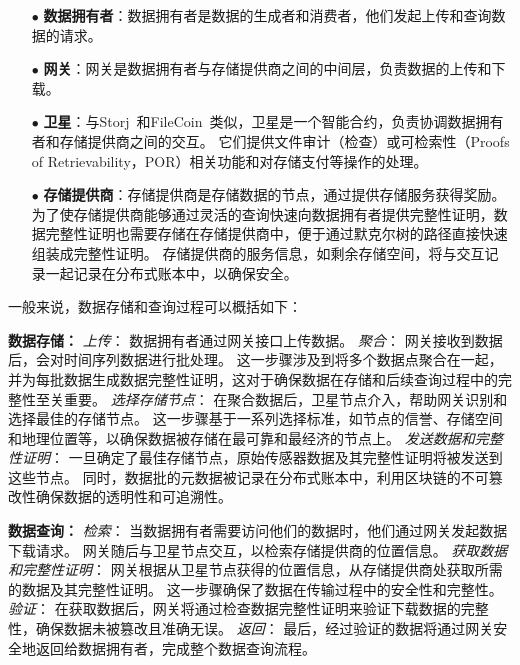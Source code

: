 \begin{itemize}
    \item[$\bullet$] \textbf{数据拥有者}：数据拥有者是数据的生成者和消费者，他们发起上传和查询数据的请求。
    \item[$\bullet$] \textbf{网关}：网关是数据拥有者与存储提供商之间的中间层，负责数据的上传和下载。
    \item[$\bullet$] \textbf{卫星}：与Storj~\cite{storj2018storj}和FileCoin~\cite{bauer2022filecoin}类似，卫星是一个智能合约，负责协调数据拥有者和存储提供商之间的交互。
    它们提供文件审计（检查）或可检索性（Proofs of Retrievability，POR）相关功能和对存储支付等操作的处理。
    \item[$\bullet$] \textbf{存储提供商}：存储提供商是存储数据的节点，通过提供存储服务获得奖励。
    为了使存储提供商能够通过灵活的查询快速向数据拥有者提供完整性证明，数据完整性证明也需要存储在存储提供商中，便于通过默克尔树的路径直接快速组装成完整性证明。
    存储提供商的服务信息，如剩余存储空间，将与交互记录一起记录在分布式账本中，以确保安全。
\end{itemize}

一般来说，数据存储和查询过程可以概括如下：

\textbf{数据存储：}
\textit{上传}：
数据拥有者通过网关接口上传数据。
\textit{聚合}：
网关接收到数据后，会对时间序列数据进行批处理。
这一步骤涉及到将多个数据点聚合在一起，并为每批数据生成数据完整性证明，这对于确保数据在存储和后续查询过程中的完整性至关重要。
\textit{选择存储节点}：
在聚合数据后，卫星节点介入，帮助网关识别和选择最佳的存储节点。
这一步骤基于一系列选择标准，如节点的信誉、存储空间和地理位置等，以确保数据被存储在最可靠和最经济的节点上。
\textit{发送数据和完整性证明}：
一旦确定了最佳存储节点，原始传感器数据及其完整性证明将被发送到这些节点。
同时，数据批的元数据被记录在分布式账本中，利用区块链的不可篡改性确保数据的透明性和可追溯性。

\textbf{数据查询：}
\textit{检索}：
当数据拥有者需要访问他们的数据时，他们通过网关发起数据下载请求。
网关随后与卫星节点交互，以检索存储提供商的位置信息。
\textit{获取数据和完整性证明}：
网关根据从卫星节点获得的位置信息，从存储提供商处获取所需的数据及其完整性证明。
这一步骤确保了数据在传输过程中的安全性和完整性。
\textit{验证}：
在获取数据后，网关将通过检查数据完整性证明来验证下载数据的完整性，确保数据未被篡改且准确无误。
\textit{返回}：
最后，经过验证的数据将通过网关安全地返回给数据拥有者，完成整个数据查询流程。

